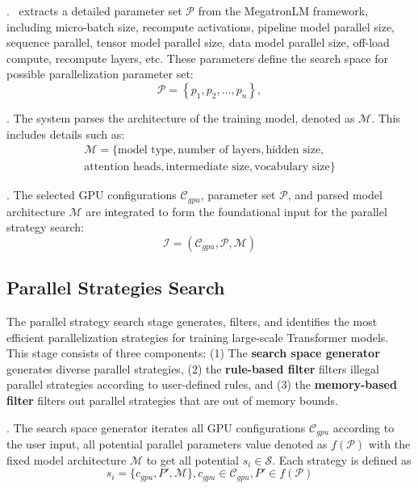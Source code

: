 . \sysname\ extracts a detailed parameter set $\mathcal{P}$ from the MegatronLM framework, including micro-batch size, recompute activations, pipeline model parallel size, sequence parallel, tensor model parallel size, data model parallel size, off-load compute, recompute layers, etc. These parameters define the search space for possible parallelization parameter set:
\begin{equation}
    \mathcal{P} = \left\{ p_1, p_2, \dots, p_n \right\},
\end{equation}

. The system parses the architecture of the training model, denoted as $\mathcal{M}$. This includes details such as:
\begin{align}
    \mathcal{M} = \{ \text{model type}, \text{number of layers},
    \text{hidden size},
    \\\text{attention heads},
    \text{intermediate size},
    \text{vocabulary size}\}
\end{align}

. The selected GPU configurations $\mathcal{C}_{gpu}$, parameter set $\mathcal{P}$, and parsed model architecture $\mathcal{M}$ are integrated to form the foundational input for the parallel strategy search:
\begin{equation}
    \mathcal{I} = (\mathcal{C}_{gpu}, \mathcal{P}, \mathcal{M})
\end{equation}

\subsection{Parallel Strategies Search}\label{sec:scheme:search}

The parallel strategy search stage generates, filters, and identifies the most efficient parallelization strategies for training large-scale Transformer models. This stage consists of three components: 
(1) The \textbf{search space generator} generates diverse parallel strategies, 
(2) the \textbf{rule-based filter} filters illegal parallel strategies according to user-defined rules, and 
(3) the \textbf{memory-based filter} filters out parallel strategies that are out of memory bounds.

. 
The search space generator iterates all GPU configurations $\mathcal{C}_{gpu}$ according to the user input,
all potential parallel parameters value denoted as $f(\mathcal{P})$ with the fixed model architecture $\mathcal{M}$ to get all potential $s_i \in \mathcal{S}$.
Each strategy is defined as
\begin{equation}
    s_i=\{ c_{gpu}, P', \mathcal{M} \}, c_{gpu} \in \mathcal{C}_{gpu}, P' \in f(\mathcal{P})
\end{equation}


